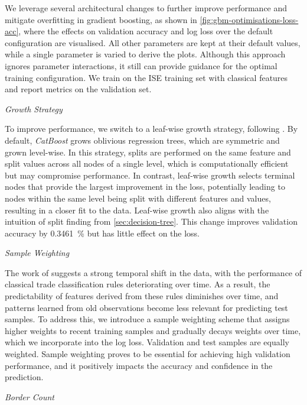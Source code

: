 We leverage several architectural changes to further improve performance and mitigate overfitting in gradient boosting, as shown in \cref{fig:gbm-optimisations-loss-acc}, where the effects on validation accuracy and log loss over the default configuration are visualised. All other parameters are kept at their default values, while a single parameter is varied to derive the plots. Although this approach ignores parameter interactions, it still can provide guidance for the optimal training configuration. We train on the ISE training set with classical features and report metrics on the validation set.

\emph{Growth Strategy}

To improve performance, we switch to a leaf-wise growth strategy, following \textcite[][4]{chenXGBoostScalableTree2016}. By default, \emph{CatBoost} grows oblivious regression trees, which are symmetric and grown level-wise. In this strategy, splits are performed on the same feature and split values across all nodes of a single level, which is computationally efficient but may compromise performance. In contrast, leaf-wise growth selects terminal nodes that provide the largest improvement in the loss, potentially leading to nodes within the same level being split with different features and values, resulting in a closer fit to the data. Leaf-wise growth also aligns with the intuition of split finding from \cref{sec:decision-tree}. This change improves validation accuracy by \SI{0.3461}{\percent} but has little effect on the loss.

\emph{Sample Weighting}

The work of \textcite[][36--38]{grauerOptionTradeClassification2022} suggests a strong temporal shift in the data, with the performance of classical trade classification rules deteriorating over time.  As a result, the predictability of features derived from these rules diminishes over time, and patterns learned from old observations become less relevant for predicting test samples. To address this, we introduce a sample weighting scheme that assigns higher weights to recent training samples and gradually decays weights over time, which we incorporate into the log loss. Validation and test samples are equally weighted. Sample weighting proves to be essential for achieving high validation performance, and it positively impacts the accuracy and confidence in the prediction.

\emph{Border Count}

